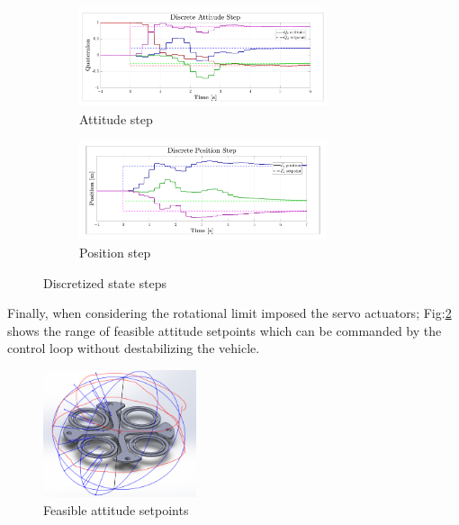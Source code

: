 \begin{figure}[hbtp]
\centering
\begin{subfigure}{\textwidth}
\centering
\includegraphics[width=0.8\textwidth]{graphs/discrete_attitude_step}
\vspace{-12pt}
\caption{Attitude step}
\end{subfigure}
\begin{subfigure}{\textwidth}
\vspace{-3pt}
\centering
\includegraphics[width=0.8\textwidth]{graphs/discrete_position_step}
\vspace{-12pt}
\caption{Position step}
\end{subfigure}
\vspace{-8pt}
\caption{Discretized state steps}
\label{fig:discrete_step}
\vspace{-12pt}
\end{figure}
\par
Finally, when considering the rotational limit imposed the servo actuators; Fig:\ref{fig:feasible-attitude} shows the range of feasible attitude setpoints which can be commanded by the control loop without destabilizing the vehicle.
\begin{figure}[htbp]
\centering
\includegraphics[width=0.4\textwidth]{figs/feasible-attitude}
\caption{Feasible attitude setpoints}
\label{fig:feasible-attitude}
\end{figure}
